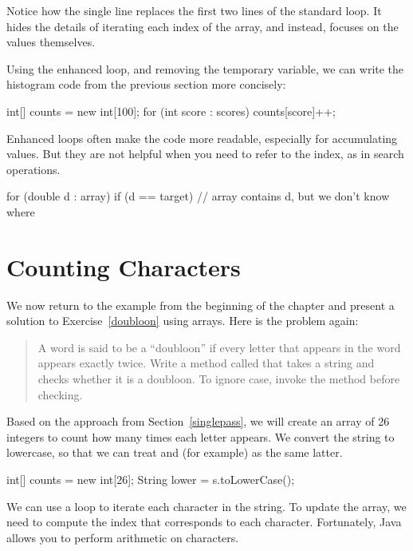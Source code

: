 Notice how the single line  replaces the first two lines of the standard  loop.
It hides the details of iterating each index of the array, and instead, focuses on the values themselves.

Using the enhanced  loop, and removing the temporary variable, we can write the histogram code from the previous section more concisely:

\begin{code}
int[] counts = new int[100];
for (int score : scores) {
    counts[score]++;
}
\end{code}

Enhanced  loops often make the code more readable, especially for accumulating values.
But they are not helpful when you need to refer to the index, as in search operations.

\begin{code}
for (double d : array) {
    if (d == target) {
        // array contains d, but we don't know where
    }
}
\end{code}


\section{Counting Characters}

We now return to the example from the beginning of the chapter and present a solution to Exercise~\ref{doubloon} using arrays.
Here is the problem again:

\begin{quote}
A word is said to be a ``doubloon'' if every letter that appears in the word appears exactly twice.
Write a method called  that takes a string and checks whether it is a doubloon.
To ignore case, invoke the  method before checking.
\end{quote}

Based on the approach from Section~\ref{singlepass}, we will create an array of 26 integers to count how many times each letter appears.
We convert the string to lowercase, so that we can treat  and  (for example) as the same latter.

\begin{code}
int[] counts = new int[26];
String lower = s.toLowerCase();
\end{code}

We can use a  loop to iterate each character in the string.
To update the  array, we need to compute the index that corresponds to each character.
Fortunately, Java allows you to perform arithmetic on characters.

